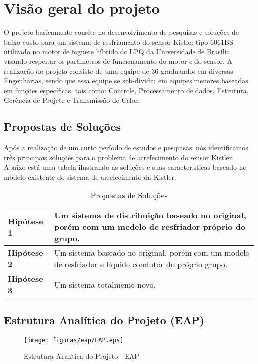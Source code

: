\chapter{Visão geral do projeto}
    
    O projeto basicamente consite no desenvolvimento de pesquisas e soluções de baixo custo para um sistema de 
    resfriamento do sensor Kistler tipo 6061BS utilizado no motor de foguete híbrido do LPQ da 
    Universidade de Brasília, visando respeitar os parâmetros de funcionamento do motor e do sensor.
    A realização do projeto consiste de uma equipe de 36 graduandos em diversas Engenharias, sendo que
    essa equipe se sub-dividiu em equipes menores baseadas em funções específicas, tais como: Controle, Processamento
    de dados, Estrutura, Gerência de Projeto e Transmissão de Calor.

\section{Propostas de Soluções}

    Após a realização de um curto período de estudos e pesquisas, nós identificamos três principais
    soluções para o problema de arrefecimento do sensor Kistler. Abaixo está uma tabela ilustrando as
    soluções e suas características baseado no modelo existente do sistema de arrefecimento da Kistler.

    \begin{table}[!htb]
        \centering
        \begin{tabular}{p{5cm}p{10cm}}
          \toprule
          \textbf{Hipótese 1}  &     Um sistema de distribuição baseado no original, 
                                    porém com um modelo de resfriador próprio do grupo.                             \\ \midrule
          \textbf{Hipótese 2} &     Um sistema baseado no original, 
                                    porém com um modelo de resfriador e líquido condutor do próprio grupo.   \\ \midrule
          \textbf{Hipótese 3} &     Um sistema totalmente novo.                      \\
          \bottomrule
        \end{tabular}
        \caption{Propostas de Soluções}
      \end{table}

\section{Estrutura Analítica do Projeto (EAP)}

\begin{figure}[!htb]
    \centering
    \texttt{[image: figuras/eap/EAP.eps]}
    \caption{Estrutura Analítica do Projeto - EAP}
 \end{figure}